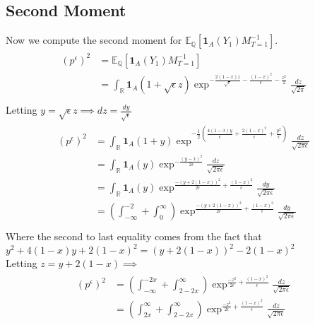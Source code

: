 \documentclass[11pt]{amsart}
\begin{document}
\subsection{Second Moment}
Now we compute the second moment for $\mathbb{E}_{\mathbb{Q}}[\mathbf{1}_{A}(Y_1) M_{T=1}^{-1}]$. 
\begin{align}
  \begin{split}
  (p^{\epsilon})^2 &= \mathbb{E}_{\mathbb{Q}}[\mathbf{1}_{A}(Y_1) M_{T=1}^{-1}] \\
   &= \int_{\mathbb{R}} \mathbf{1}_{A}(1+\sqrt{\epsilon}z)\exp^{-\frac{2(1-x)z}{\sqrt{\epsilon}}-\frac{(1-x)^2}{\epsilon}-\frac{z^2}{2}} \frac{dz}{\sqrt{2\pi}} \\
  \end{split}
\end{align}
Letting $y = \sqrt{\epsilon}z \implies dz = \frac{dy}{\sqrt{\epsilon}}$
\begin{align}
  \begin{split}
 (p^{\epsilon})^2 &= \int_{\mathbb{R}} \mathbf{1}_{A}(1+y)\exp^{-\frac{1}{2}(\frac{4(1-x)y}{\epsilon}+\frac{2(1-x)^2}{\epsilon}+\frac{y^2}{\epsilon})} \frac{dz}{\sqrt{2\pi\epsilon}} \\
  &= \int_{\mathbb{R}} \mathbf{1}_{A}(y)\exp^{-\frac{(y-x)^2}{2\epsilon}} \frac{dz}{\sqrt{2\pi\epsilon}} \\
  &= \int_{\mathbb{R}} \mathbf{1}_{A}(y)\exp^{\frac{-(y+2(1-x))^2}{2\epsilon}+\frac{(1-x)^2}{\epsilon}} \frac{dy}{\sqrt{2\pi\epsilon}}\\
  &= (\int_{-\infty}^{-2}+\int_{0}^{\infty})\exp^{\frac{-(y+2(1-x))^2}{2\epsilon}+\frac{(1-x)^2}{\epsilon}} \frac{dy}{\sqrt{2\pi\epsilon}}\\
 \end{split}
\end{align}
Where the second to last equality comes from the fact that $y^2+4(1-x)y+2(1-x)^2=(y+2(1-x))^2-2(1-x)^2$
\\
Letting $z = y+2(1-x) \implies$
\begin{align}
  \begin{split}
 (p^{\epsilon})^2 &= (\int_{-\infty}^{-2x}+\int_{2-2x}^{\infty})\exp^{\frac{-z^2}{2\epsilon}+\frac{(1-x)^2}{\epsilon}} \frac{dz}{\sqrt{2\pi\epsilon}} \\
  &= (\int_{2x}^{\infty}+\int_{2-2x}^{\infty})\exp^{\frac{-z^2}{2\epsilon}+\frac{(1-x)^2}{\epsilon}} \frac{dz}{\sqrt{2\pi\epsilon}} \\
 \end{split}
\end{align}
\end{document}
